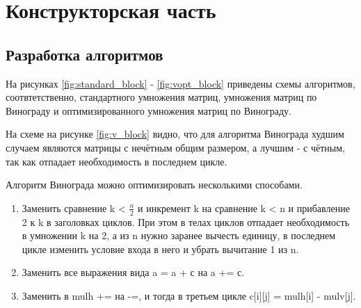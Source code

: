 \chapter{Конструкторская часть}


\section{Разработка алгоритмов}

На рисунках \ref{fig:standard_block} -  \ref{fig:vopt_block} приведены схемы алгоритмов, соотвтетственно, стандартного умножения матриц, умножения матриц по Винограду и оптимизированного умножения матриц по Винограду.

На схеме на рисунке \ref{fig:v_block} видно, что для алгоритма Винограда худшим случаем являются матрицы с нечётным общим размером, а лучшим - с чётным, так как отпадает необходимость в последнем цикле.

Алгоритм Винограда можно оптимизировать несколькими способами.
\begin{enumerate}[label={\arabic*)}]
	\item Заменить сравнение k < $\frac{n}{2}$ и инкремент k на сравнение k < n и прибавление 2 к k в заголовках циклов. При этом в телах циклов отпадает необходимость в умножении k на 2, а из n нужно заранее вычесть единицу, в последнем цикле изменить условие входа в него и убрать вычитание 1 из n.  
	\item Заменить все выражения вида a = a + с на a += с.
	\item Заменить в mulh += на -=, и тогда в третьем цикле  c[i][j] = mulh[i] - mulv[j].
\end{enumerate}


